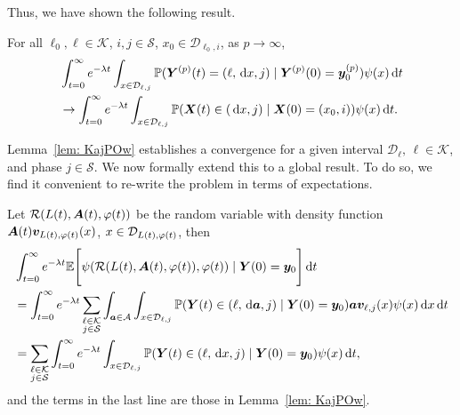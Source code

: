 Thus, we have shown the following result.
\begin{lem}\label{lem: KajPOw}
	For all \(\ell_0,\ell\in\mathcal K\), \(i,j\in\mathcal S\), \(x_0\in\mathcal D_{\ell_0,i}\), as \(p\to\infty\), 
	\begin{align}
		&\int_{t=0}^\infty e^{-\lambda t}\int_{x\in\mathcal D_{\ell,j}}\mathbb P( {\boldsymbol Y}^{(p)}(t) = (\ell,\, \mathrm{d} x,j) \mid \boldsymbol Y^{(p)}(0)=\boldsymbol y_0^{(p)})  \psi(x)\, \mathrm{d} t \nonumber
		\\&\to \int_{t=0}^\infty e^{-\lambda t}  \int_{x\in\mathcal{D}_{\ell,j}} \mathbb P(\boldsymbol X(t)\in(\, \mathrm{d} x, j)  
		\mid \boldsymbol X(0)=(x_0, i))\psi(x)\, \mathrm{d} t. \nonumber
	\end{align}
\end{lem}

Lemma~\ref{lem: KajPOw} establishes a convergence for a given interval \(\mathcal D_\ell,\, \ell\in\mathcal K\), and phase \(j\in\mathcal S\). We now formally extend this to a global result. To do so, we find it convenient to re-write the problem in terms of expectations. 
 
Let \(\mathcal R(L(t),\boldsymbol A(t),\varphi(t))\) be the random variable with density function \(\boldsymbol A(t)\boldsymbol v_{L(t),\varphi(t)}(x)\), \(x\in\mathcal{D}_{L(t),\varphi(t)}\), then
\begin{align}
	&\int_{t=0}^\infty e^{-\lambda t}\mathbb E\Bigg[\psi(\mathcal R(L(t),\boldsymbol A(t),\varphi(t)),\varphi(t) )  \mid \nonumber
	\boldsymbol Y (0)=\boldsymbol y_0 \Bigg] \, \mathrm{d} t 
	\\&=\int_{t=0}^\infty e^{-\lambda t}\sum_{\substack{\ell\in\mathcal K\\j\in\mathcal{S}}}\int_{\boldsymbol a\in\mathcal A}\int_{x\in\mathcal{D}_{\ell,j}}\mathbb P( {\boldsymbol Y}(t) \in (\ell,\, \mathrm{d} \boldsymbol a,j) \mid \boldsymbol Y(0)=\boldsymbol y_0)\boldsymbol a\boldsymbol v_{\ell,j}(x)  \psi(x)\, \mathrm{d} x\, \mathrm{d} t \nonumber 
	\\&=\sum_{\substack{\ell\in\mathcal K\\j\in\mathcal{S}}}\int_{t=0}^\infty e^{-\lambda t}\int_{x\in\mathcal D_{\ell,j}}\mathbb P( {\boldsymbol Y} (t) \in (\ell,\, \mathrm{d} x,j) \mid \boldsymbol Y (0)=\boldsymbol y_0 )  \psi(x)\, \mathrm{d} t,
\end{align}
and the terms in the last line are those in Lemma~\ref{lem: KajPOw}. 

